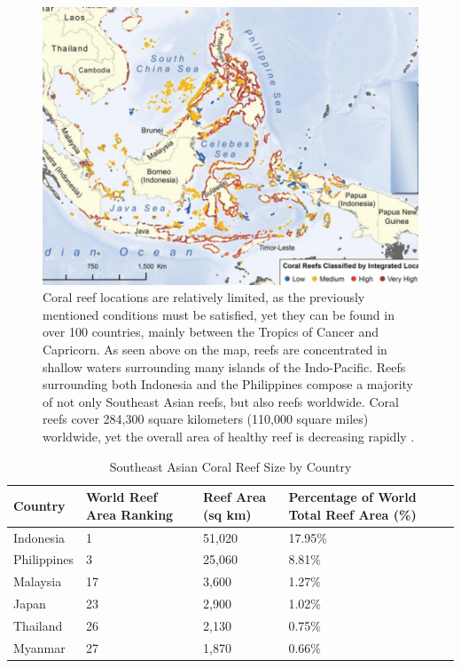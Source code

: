 \documentclass{book}\usepackage{knitr}
\begin{document}
{\begin{figure}
\includegraphics[width=\linewidth]{images/reefmap}
\caption{Coral reef locations are relatively limited, as the previously mentioned conditions must be satisfied, yet they can be found in over 100 countries, mainly between the Tropics of Cancer and Capricorn. As seen above on the map, reefs are concentrated in shallow waters surrounding many islands of the Indo-Pacific. Reefs surrounding both Indonesia and the Philippines compose a majority of not only Southeast Asian reefs, but also reefs worldwide.   Coral reefs cover 284,300 square kilometers (110,000 square miles) worldwide, yet the overall area of healthy reef is decreasing rapidly \citep{Watlas}.}
\label{fig:Map of Southeast Asian Coral Reefs}
\end{figure}

\begin{table}[h]
\caption{Southeast Asian Coral Reef Size by Country}
\label{tab:Southeast Asian Coral Reef Size by Country}
\begin{tabular}{llll}
Country     & World Reef Area Ranking & Reef Area (sq km) & Percentage of World Total Reef Area (\%) \\ 
\hline\hline
Indonesia   & 1                       & 51,020            & 17.95\% \\ 
\hline
Philippines & 3                       & 25,060            & 8.81\%  \\ 
\hline
Malaysia    & 17                      & 3,600             & 1.27\%  \\ 
\hline
Japan       & 23                      & 2,900             & 1.02\%  \\ 
\hline
Thailand    & 26                      & 2,130             & 0.75\%  \\ 
\hline
Myanmar     & 27                      & 1,870             & 0.66\%  \\
\end{tabular}
\end{table}

}
\end{document}
